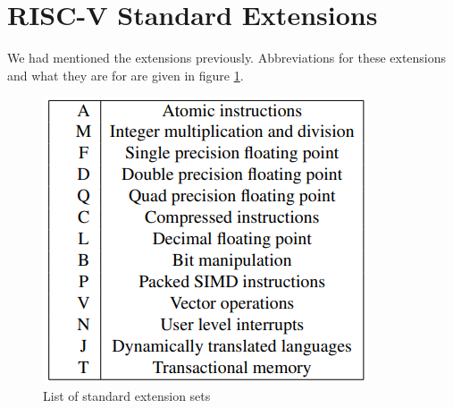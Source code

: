 \section{RISC-V Standard Extensions}
We had mentioned the extensions previously. Abbreviations for these extensions and what they are for are given in figure \ref{fig:list_of_standard_extension_sets}.
\begin{figure}
    \centering
    \includegraphics{riscv/list_of_standard_extension_sets.png}
    \caption{List of standard extension sets \cite{erfan}}
    \label{fig:list_of_standard_extension_sets}
\end{figure}

